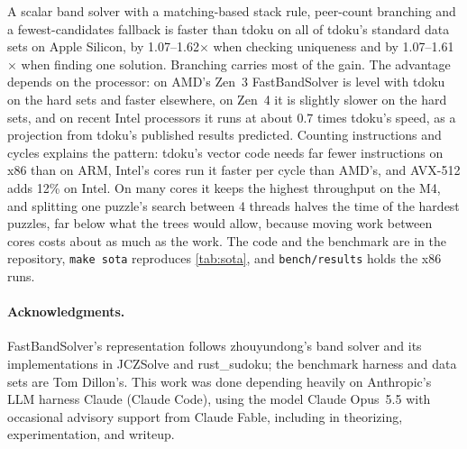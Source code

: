 \documentclass[11pt]{article}
\theoremstyle{definition}
\theoremstyle{plain}
\begin{document}
A scalar band solver with a matching-based stack rule, peer-count branching and a fewest-candidates fallback is faster
than tdoku on all of tdoku's standard data sets on Apple Silicon, by 1.07--1.62$\times$ when checking uniqueness and by
1.07--1.61$\times$ when finding one solution. Branching carries most of the gain. The advantage depends on the
processor: on AMD's Zen~3 FastBandSolver is level with tdoku on the hard sets and faster elsewhere, on Zen~4 it is
slightly slower on the hard sets, and on recent Intel processors it runs at about 0.7 times tdoku's speed, as a
projection from tdoku's published results predicted. Counting instructions and cycles explains the pattern: tdoku's
vector code needs far fewer instructions on x86 than on ARM, Intel's cores run it faster per cycle than AMD's, and
AVX-512 adds 12\% on Intel. On many cores it keeps the highest throughput on the M4, and splitting one puzzle's search between 4
threads halves the time of the hardest puzzles, far below what the trees would allow, because moving work between
cores costs about as much as the work. The code and the benchmark are in the repository, \texttt{make sota}
reproduces \cref{tab:sota}, and \texttt{bench/results} holds the x86 runs.

\paragraph{Acknowledgments.} FastBandSolver's representation follows zhouyundong's band solver and its implementations
in JCZSolve and rust\_sudoku; the benchmark harness and data sets are Tom Dillon's. This work was done depending heavily on Anthropic's LLM harness Claude (Claude Code), using the model Claude Opus~5.5 with occasional advisory support from Claude Fable, including in theorizing, experimentation, and writeup.



\end{document}

